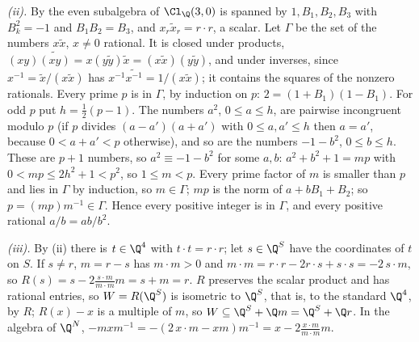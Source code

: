 \emph{(ii).} By  the even subalgebra of $\Cl_{\Q}(3,0)$ is spanned by $1, B_{1}, B_{2}, B_{3}$ with $B_{k}^{2} = -1$ and $B_{1}B_{2} = B_{3}$, and $x_{r}\tilde{x}_{r} = r \cdot r$, a scalar. Let $\Gamma$ be the set of the numbers $x\tilde{x}$, $x \ne 0$ rational. It is closed under products, $(xy)\widetilde{(xy)} = x(y\tilde{y})\tilde{x} = (x\tilde{x})(y\tilde{y})$, and under inverses, since $x^{-1} = \tilde{x}/(x\tilde{x})$ has $x^{-1}\widetilde{x^{-1}} = 1/(x\tilde{x})$; it contains the squares of the nonzero rationals. Every prime $p$ is in $\Gamma$, by induction on $p$: $2 = (1 + B_{1})(1 - B_{1})$. For odd $p$ put $h = \tfrac12(p - 1)$. The numbers $a^{2}$, $0 \le a \le h$, are pairwise incongruent modulo $p$ (if $p$ divides $(a - a')(a + a')$ with $0 \le a, a' \le h$ then $a = a'$, because $0 < a + a' < p$ otherwise), and so are the numbers $-1 - b^{2}$, $0 \le b \le h$. These are $p + 1$ numbers, so $a^{2} \equiv -1 - b^{2}$ for some $a, b$: $a^{2} + b^{2} + 1 = mp$ with $0 < mp \le 2h^{2} + 1 < p^{2}$, so $1 \le m < p$. Every prime factor of $m$ is smaller than $p$ and lies in $\Gamma$ by induction, so $m \in \Gamma$; $mp$ is the norm of $a + bB_{1} + B_{2}$; so $p = (mp)m^{-1} \in \Gamma$. Hence every positive integer is in $\Gamma$, and every positive rational $a/b = ab/b^{2}$.

\emph{(iii).} By (ii) there is $t \in \Q^{4}$ with $t \cdot t = r \cdot r$; let $s \in \Q^{S}$ have the coordinates of $t$ on $S$. If $s \ne r$, $m = r - s$ has $m \cdot m > 0$ and $m \cdot m = r \cdot r - 2r \cdot s + s \cdot s = -2\,s \cdot m$, so $R(s) = s - 2\frac{s \cdot m}{m \cdot m}m = s + m = r$. $R$ preserves the scalar product and has rational entries, so $W = R(\Q^{S})$ is isometric to $\Q^{S}$, that is, to the standard $\Q^{4}$, by $R$; $R(x) - x$ is a multiple of $m$, so $W \subseteq \Q^{S} + \Q m = \Q^{S} + \Q r$. In the algebra of $\Q^{N}$, $-mxm^{-1} = -(2\,x \cdot m - xm)m^{-1} = x - 2\frac{x \cdot m}{m \cdot m}m$.

